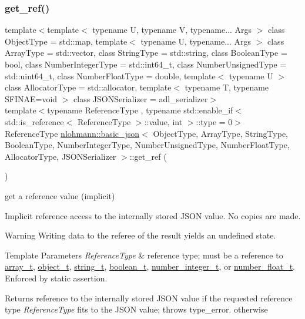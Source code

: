 \subsubsection{\texorpdfstring{get\+\_\+ref()}{get\_ref()}\hspace{0.1cm}{\footnotesize\ttfamily [1/2]}}
{\footnotesize\ttfamily template$<$template$<$ typename U, typename V, typename... Args $>$ class Object\+Type = std\+::map, template$<$ typename U, typename... Args $>$ class Array\+Type = std\+::vector, class String\+Type  = std\+::string, class Boolean\+Type  = bool, class Number\+Integer\+Type  = std\+::int64\+\_\+t, class Number\+Unsigned\+Type  = std\+::uint64\+\_\+t, class Number\+Float\+Type  = double, template$<$ typename U $>$ class Allocator\+Type = std\+::allocator, template$<$ typename T, typename S\+F\+I\+N\+A\+E=void $>$ class J\+S\+O\+N\+Serializer = adl\+\_\+serializer$>$ \\
template$<$typename Reference\+Type , typename std\+::enable\+\_\+if$<$ std\+::is\+\_\+reference$<$ Reference\+Type $>$\+::value, int $>$\+::type  = 0$>$ \\
Reference\+Type \mbox{\hyperlink{classnlohmann_1_1basic__json}{nlohmann\+::basic\+\_\+json}}$<$ Object\+Type, Array\+Type, String\+Type, Boolean\+Type, Number\+Integer\+Type, Number\+Unsigned\+Type, Number\+Float\+Type, Allocator\+Type, J\+S\+O\+N\+Serializer $>$\+::get\+\_\+ref (\begin{DoxyParamCaption}{ }\end{DoxyParamCaption})\hspace{0.3cm}{\ttfamily [inline]}}



get a reference value (implicit) 

Implicit reference access to the internally stored J\+S\+ON value. No copies are made.

\begin{DoxyWarning}{Warning}
Writing data to the referee of the result yields an undefined state.
\end{DoxyWarning}

\begin{DoxyTemplParams}{Template Parameters}
{\em Reference\+Type} & reference type; must be a reference to \mbox{\hyperlink{classnlohmann_1_1basic__json_ae095578e03df97c5b3991787f1056374}{array\+\_\+t}}, \mbox{\hyperlink{classnlohmann_1_1basic__json_aa1eb13d5aa86f80cbee6c58e90fbaf49}{object\+\_\+t}}, \mbox{\hyperlink{classnlohmann_1_1basic__json_a61f8566a1a85a424c7266fb531dca005}{string\+\_\+t}}, \mbox{\hyperlink{classnlohmann_1_1basic__json_a4c919102a9b4fe0d588af64801436082}{boolean\+\_\+t}}, \mbox{\hyperlink{classnlohmann_1_1basic__json_a98e611d67b7bd75307de99c9358ab2dc}{number\+\_\+integer\+\_\+t}}, or \mbox{\hyperlink{classnlohmann_1_1basic__json_a88d6103cb3620410b35200ee8e313d97}{number\+\_\+float\+\_\+t}}. Enforced by static assertion.\\
\hline
\end{DoxyTemplParams}
\begin{DoxyReturn}{Returns}
reference to the internally stored J\+S\+ON value if the requested reference type {\itshape Reference\+Type} fits to the J\+S\+ON value; throws type\+\_\+error. otherwise
\end{DoxyReturn}

